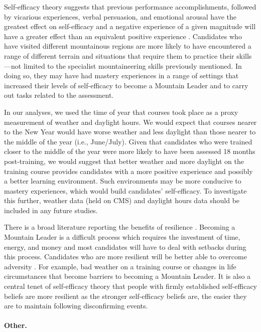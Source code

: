 \documentclass[
  12pt,
  a4paper,
]{book}
\begin{document}
Self-efficacy theory suggests that previous performance accomplishments, followed by vicarious experiences, verbal persuasion, and emotional arousal have the greatest effect on self-efficacy and a negative experience of a given magnitude will have a greater effect than an equivalent positive experience \citep{Bandura1977, Bandura1982}. Candidates who have visited different mountainous regions are more likely to have encountered a range of different terrain and situations that require them to practice their skills---not limited to the specialist mountaineering skills previously mentioned. In doing so, they may have had mastery experiences in a range of settings that increased their levels of self-efficacy to become a Mountain Leader and to carry out tasks related to the assessment.

In our analyses, we used the time of year that courses took place as a proxy measurement of weather and daylight hours. We would expect that courses nearer to the New Year would have worse weather and less daylight than those nearer to the middle of the year (i.e., June/July). Given that candidates who were trained closer to the middle of the year were more likely to have been assessed 18 months post-training, we would suggest that better weather and more daylight on the training course provides candidates with a more positive experience and possibly a better learning environment. Such environments may be more conducive to mastery experiences, which would build candidates' self-efficacy. To investigate this further, weather data (held on CMS) and daylight hours data should be included in any future studies.

There is a broad literature reporting the benefits of resilience \citep[e.g.,][]{Seery2016, Smith2008}. Becoming a Mountain Leader is a difficult process which requires the investment of time, energy, and money and most candidates will have to deal with setbacks during this process. Candidates who are more resilient will be better able to overcome adversity \citep{Smith2008}. For example, bad weather on a training course or changes in life circumstances that become barriers to becoming a Mountain Leader. It is also a central tenet of self-efficacy theory that people with firmly established self-efficacy beliefs are more resilient \citep{Bandura1997} as the stronger self-efficacy beliefs are, the easier they are to maintain following disconfirming events.

\hypertarget{other.}{%
\paragraph{Other.}\label{other.}}
\end{document}
